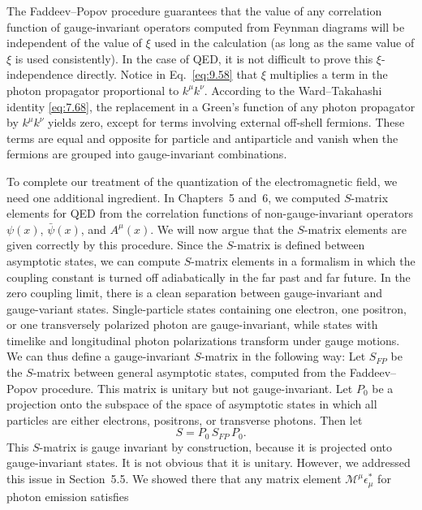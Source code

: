 The Faddeev--Popov procedure guarantees that the value of any correlation
function of gauge-invariant operators computed from Feynman diagrams will be
independent of the value of $\xi$ used in the calculation (as long as the same
value of $\xi$ is used consistently).  In the case of QED, it is not difficult
to prove this $\xi$-independence directly.  Notice in Eq.~\eqref{eq:9.58}
that $\xi$ multiplies a term in the photon propagator proportional to
$k^\mu k^\nu$.  According to the Ward--Takahashi identity \eqref{eq:7.68}, the
replacement in a Green's function of any photon propagator by $k^\mu k^\nu$
yields zero, except for terms involving external off-shell fermions.  These
terms are equal and opposite for particle and antiparticle and vanish when the
fermions are grouped into gauge-invariant combinations.

To complete our treatment of the quantization of the electromagnetic field, we
need one additional ingredient.  In Chapters~5 and~6, we computed $S$-matrix
elements for QED from the correlation functions of non-gauge-invariant
operators $\psi(x)$, $\bar{\psi}(x)$, and $A^\mu(x)$.  We will now argue that
the $S$-matrix elements are given correctly by this procedure.  Since the
$S$-matrix is defined between asymptotic states, we can compute $S$-matrix
elements in a formalism in which the coupling constant is turned off
adiabatically in the far past and far future.  In the zero coupling limit,
there is a clean separation between gauge-invariant and gauge-variant states.
Single-particle states containing one electron, one positron, or one
transversely polarized photon are gauge-invariant, while states with timelike
and longitudinal photon polarizations transform under gauge motions.  We can
thus define a gauge-invariant $S$-matrix in the following way: Let $S_{FP}$ be
the $S$-matrix between general asymptotic states, computed from the
Faddeev--Popov procedure.  This matrix is unitary but not gauge-invariant.
Let $P_0$ be a projection onto the subspace of the space of asymptotic states
in which all particles are either electrons, positrons, or transverse photons.
Then let
\begin{equation}
  S = P_0\,S_{FP}\,P_0 .
  \label{eq:9.59}
\end{equation}
This $S$-matrix is gauge invariant by construction, because it is projected
onto gauge-invariant states.  It is not obvious that it is unitary.  However,
we addressed this issue in Section~5.5.  We showed there that any matrix
element $\mathcal{M}^\mu\epsilon^{*}_\mu$ for photon emission satisfies
